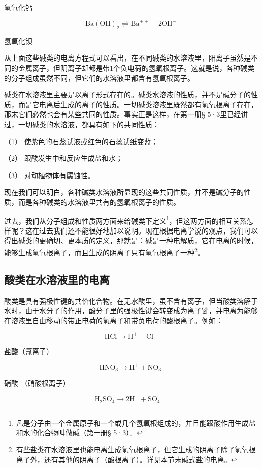 氢氧化钙

\[
\mathrm{Ba(OH)} _ {2} \rightleftharpoons \mathrm{Ba} ^ {+ +} + 2 \mathrm{OH} ^ {-}
\]

氢氧化钡

从上面这些碱类的电离方程式可以看出，在不同碱类的水溶液里，阳离子虽然是不同的金属离子，但阴离子却都是带1个负电荷的氢氧根离子。这就是说，各种碱类的分子组成虽然不同，但它们的水溶液里都含有氢氧根离子。

碱类在水溶液里主要是以离子形式存在的。碱类水溶液的性质，并不是碱分子的性质，而是它电离后生成的离子的性质。一切碱类溶液里既然都有氢氧根离子存在，那末它们必然也会有某些共同的性质。事实正是这样，在第一册§
5·3里已经讲过，一切碱类的水溶液，都具有如下的共同性质：

（1） 使紫色的石蕊试液或红色的石蕊试纸变蓝；

（2） 跟酸发生中和反应生成盐和水；

（3） 对动植物体有腐蚀性。

现在我们可以明白，各种碱类水溶液所显现的这些共同性质，并不是碱分子的性质，而是各种碱类的水溶液里共有的氢氧根离子的性质。

过去，我们从分子组成和性质两方面来给碱类下定义\footnote{凡是分子由一个金属原子和一个或几个氢氧根组成的，并且能跟酸作用生成盐和水的化合物叫做碱（第一册§
  5·3）。}，但这两方面的相互关系怎样呢？这在过去我们还不能很好地加以说明。现在根据电离学说的观点，我们可以得出碱类的更确切、更本质的定义，那就是：碱是一种电解质，它在电离的时候，能够生成氢氧根离子，而且生成的阴离子只有氢氧根离子一种\footnote{有些盐类在水溶液里也能电离生成氢氧根离子，但它生成的阴离子除了氢氧根离子外，还有其他的阴离子（酸根离子）。详见本节末碱式盐的电离。}。

\subsection{酸类在水溶液里的电离}

酸类是具有强极性键的共价化合物。在无水酸里，虽不含有离子，但当酸类溶解于水时，由于水分子的作用，酸分子里的强极性键会转变成为离子键，并电离为能够在溶液里自由移动的带正电荷的氢离子和带负电荷的酸根离子。例如：

\[
\mathrm{HCl} \xrightarrow {\quad} \mathrm{H} ^ {+} + \mathrm{Cl} ^ {-}
\]

盐酸（氯离子）

\[
\mathrm{HNO} _ {3} \xrightarrow {\quad} \mathrm{H} ^ {+} + \mathrm{NO} _ {3} ^ {-}
\]

硝酸 （硝酸根离子）

\[
\mathrm{H} _ {2} \mathrm{SO} _ {4} \xrightarrow {\quad} 2 \mathrm{H} ^ {+} + \mathrm{SO} _ {4} ^ {- -}
\]

